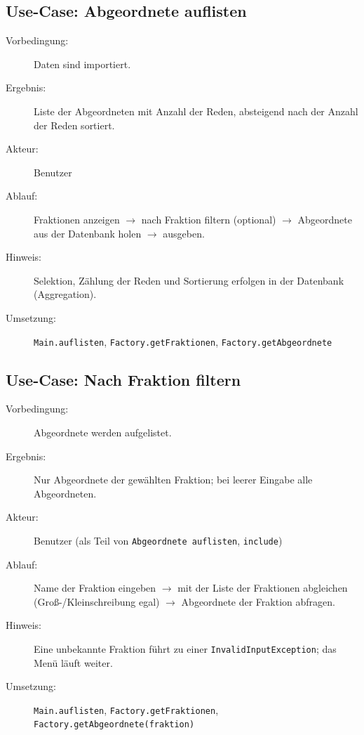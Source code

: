 \subsection{Use-Case: Abgeordnete auflisten}
\begin{description}
    \item[Vorbedingung:] Daten sind importiert.
    \item[Ergebnis:] Liste der Abgeordneten mit Anzahl der Reden, absteigend nach der Anzahl der Reden sortiert.
    \item[Akteur:] Benutzer
    \item[Ablauf:] Fraktionen anzeigen $\rightarrow$ nach Fraktion filtern (optional) $\rightarrow$ Abgeordnete aus der Datenbank holen $\rightarrow$ ausgeben.
    \item[Hinweis:] Selektion, Zählung der Reden und Sortierung erfolgen in der Datenbank (Aggregation).
    \item[Umsetzung:] \texttt{Main.auflisten}, \texttt{Factory.getFraktionen}, \texttt{Factory.getAbgeordnete}
\end{description}

\subsection{Use-Case: Nach Fraktion filtern}
\begin{description}
    \item[Vorbedingung:] Abgeordnete werden aufgelistet.
    \item[Ergebnis:] Nur Abgeordnete der gewählten Fraktion; bei leerer Eingabe alle Abgeordneten.
    \item[Akteur:] Benutzer (als Teil von \texttt{Abgeordnete auflisten}, \texttt{include})
    \item[Ablauf:] Name der Fraktion eingeben $\rightarrow$ mit der Liste der Fraktionen abgleichen (Groß-/Kleinschreibung egal) $\rightarrow$ Abgeordnete der Fraktion abfragen.
    \item[Hinweis:] Eine unbekannte Fraktion führt zu einer \texttt{InvalidInputException}; das Menü läuft weiter.
    \item[Umsetzung:] \texttt{Main.auflisten}, \texttt{Factory.getFraktionen}, \texttt{Factory.getAbgeordnete(fraktion)}
\end{description}

